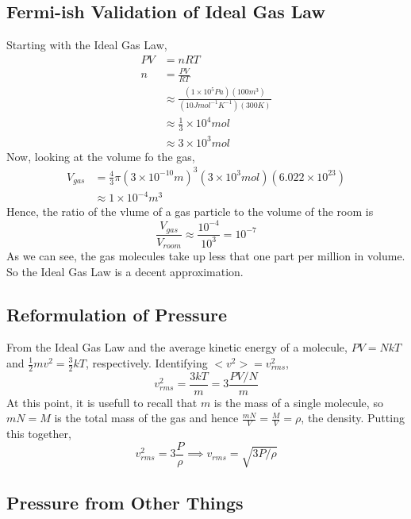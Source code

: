\documentclass{article}
\begin{document}
\subsection{Fermi-ish Validation of Ideal Gas Law}

Starting with the Ideal Gas Law,
\begin{align*}
PV &= nRT \\
n &= \frac{PV}{RT} \\
&\approx \frac{(1\times10^5 Pa)(100 m^3)}{(10 J mol^{-1} K^{-1})(300 K)} \\
&\approx \frac{1}{3}\times10^4 mol \\
&\approx 3\times10^3 mol
\end{align*}
Now, looking at the volume fo the gas,
\begin{align*}
V_{gas} &= \frac{4}{3}\pi (3\times10^{-10} m)^3(3\times 10^3 mol)(6.022\times10^{23}) \\
&\approx 1\times10^{-4} m^3
\end{align*}
Hence, the ratio of the vlume of a gas particle to the volume of the room is
\begin{equation}
\frac{V_{gas}}{V_{room}} \approx \frac{10^{-4}}{10^3} = 10^{-7}
\end{equation}
As we can see, the gas molecules take up less that one part per million in volume. So the Ideal Gas Law is a decent approximation.

\subsection{Reformulation of Pressure}

From the Ideal Gas Law and the average kinetic energy of a molecule, $PV = NkT$ and $\frac{1}{2} mv^2 = \frac{3}{2}kT$, respectively. Identifying $<v^2> = v_{rms}^2$,
\begin{equation}
v_{rms}^2 = \frac{3kT}{m} = 3\frac{PV/N}{m}
\end{equation}
At this point, it is usefull to recall that $m$ is the mass of a single molecule, so $mN=M$ is the total mass of the gas and hence $\frac{mN}{V} = \frac{M}{V} = \rho$, the density. Putting this together,
\begin{equation}
v_{rms}^2 = 3\frac{P}{\rho} \implies v_{rms} = \sqrt{3P/\rho}
\end{equation}

\subsection{Pressure from Other Things}
\end{document}
